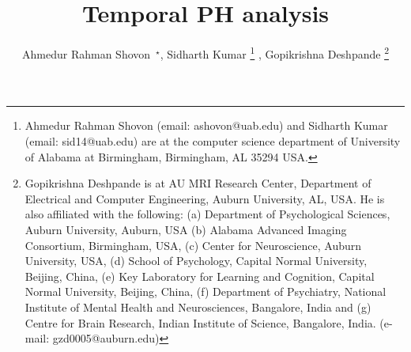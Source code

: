 \documentclass[runningheads]{llncs}
\begin{document}
\title{Temporal PH analysis}
\pagestyle{empty}

\author{Ahmedur Rahman Shovon~$^\star$, Sidharth Kumar \thanks{Ahmedur Rahman Shovon (email: ashovon@uab.edu) and Sidharth Kumar (email: sid14@uab.edu) are at the computer science department of University of Alabama at Birmingham, Birmingham, AL 35294 USA.}
, Gopikrishna Deshpande \thanks{Gopikrishna Deshpande is at AU MRI Research Center, Department of Electrical and Computer Engineering, Auburn University, AL, USA. He is also affiliated with the following: (a) Department of Psychological Sciences, Auburn University, Auburn, USA (b) Alabama Advanced Imaging Consortium, Birmingham, USA, (c) Center for Neuroscience, Auburn University, USA, (d) School of Psychology, Capital Normal University, Beijing, China, (e) Key Laboratory for Learning and Cognition, Capital Normal University, Beijing, China, (f) Department of Psychiatry, National Institute of Mental Health and Neurosciences, Bangalore, India and (g) Centre for Brain Research, Indian Institute of Science, Bangalore, India. (e-mail: gzd0005@auburn.edu)}
}
\institute{}







\end{document}
